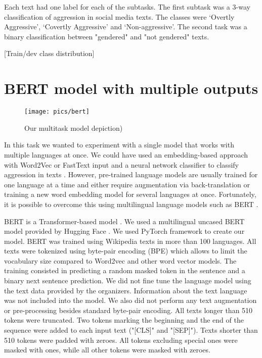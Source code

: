 \documentclass[10pt, a4paper]{article}
\begin{document}
Each text had one label for each of the subtasks. The first subtask was a 3-way classification of aggression in social media texts. The classes were ‘Overtly Aggressive’, ‘Covertly Aggressive’ and ‘Non-aggressive’. The second task was a binary classification between "gendered" and "not gendered" texts.

[Train/dev class distribution]
\section{BERT model with multiple outputs}

\begin{figure}[tbh]
	\begin{center}
		\texttt{[image: pics/bert]}
		\caption{Our multitask model depiction)}
		\label{fig:bert}
	\end{center}
\end{figure}

In this task we wanted to experiment with a single model that works with multiple languages at once. We could have used an embedding-based approach with Word2Vec \cite{word2vec} or FastText \cite{fasttext} input and a neural network classifier to classify aggression in texts \cite{gordeev2016}. However, pre-trained language models are usually trained for one language at a time and either require augmentation via back-translation \cite{Aroyehun} or training a new word embedding model for several languages at once. Fortunately, it is possible to overcome this using multilingual language models such as BERT \cite{bert}.

BERT is a Transformer-based model \cite{attention}. We used a multilingual uncased BERT model provided by Hugging Face \cite{Wolf2019HuggingFacesTS}. We used PyTorch framework to create our model. BERT was trained using Wikipedia texts in more than 100 languages. All texts were tokenized using byte-pair encoding (BPE) which allows to limit the vocabulary size compared to Word2vec and other word vector models. The training consisted in predicting a random masked token in the sentence and a binary next sentence prediction. We did not fine tune the language model using the text data provided by the organizers. Information about the text language was not included into the model. We also did not perform any text augmentation or pre-processing besides standard byte-pair encoding. All texts longer than 510 tokens were truncated. Two tokens marking the beginning and the end of the sequence were added to each input text ("[CLS]" and "[SEP]"). Texts shorter than 510 tokens were padded with zeroes. All tokens excluding special ones were masked with ones, while all other tokens were masked with zeroes.
\end{document}
